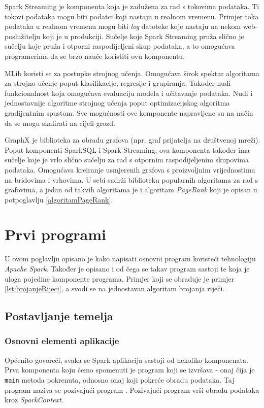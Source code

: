 \documentclass[times, utf8, zavrsni, numeric]{fer}
\begin{document}
Spark Streaming je komponenta koja je zadužena za rad s tokovima podataka. Ti tokovi podataka mogu biti podatci koji nastaju u realnom vremenu. Primjer toka podataka u realnom vremenu mogu biti \emph{log} datoteke koje nastaju na nekom web-poslužitelju koji je u produkciji. Sučelje koje Spark Streaming pruža slično je sučelju koje pruža i otporni raspodijeljeni skup podataka, a to omogućava programerima da se brzo nauče koristiti ovu komponentu. 

MLib koristi se za postupke strojnog učenja. Omogućava širok spektar algoritama za strojno učenje poput klasifikacije, regresije i  grupiranja. Također nudi funkcionalnost koja omogućava evaluaciju modela i učitavanje podataka. Nudi i jednostavnije algoritme strojnog učenja poput optimizacijskog algoritma gradijentnim spustom. Sve mogućnosti ove komponente napravljene su na način da se mogu skalirati na cijeli grozd.

GraphX je biblioteka za obradu grafova (npr. graf prijatelja na društvenoj mreži). Poput komponenti SparkSQL i Spark Streaming,  ova komponenta također ima sučelje koje je vrlo slično sučelju za rad s otpornim raspodijeljenim skupovima podataka. Omogućava kreiranje usmjerenih grafova s proizvoljnim vrijednostima na bridovima i vrhovima. U sebi sadrži biblioteku popularnih algoritama za rad s grafovima, a jedan od takvih algoritama je i algoritam \emph{PageRank} koji je opisan u potpoglavlju \ref{algoritamPageRank}.

\chapter{Prvi programi}
U ovom poglavlju opisano je kako napisati osnovni program koristeći tehnologiju \emph{Apache Spark}. Također je opisano i od čega se takav program sastoji te koja je uloga pojedine komponente programa. Primjer koji se obrađuje je primjer \ref{lst:brojanjeRijeci}, a svodi se na jednostavan algoritam brojanja riječi.

\section{Postavljanje temelja}
\subsection{Osnovni elementi aplikacije}
Općenito govoreći, svaka se Spark aplikacija sastoji  od nekoliko komponenata. Prva komponenta koju ćemo spomenuti je program koji se izvršava - onaj čija je \texttt{main} metoda pokrenuta, odnosno onaj koji pokreće obradu podataka. Taj program naziva se pozivajući program . Pozivajući program vrši obradu podataka kroz  \emph{SparkContext}.
\end{document}
